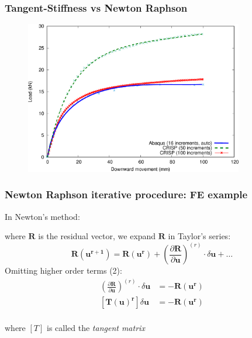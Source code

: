 \documentclass[notes]{beamer}
\begin{document}
\begin{frame}
\frametitle{Tangent-Stiffness vs Newton Raphson}
\begin{figure}[ht]
	\centering
	\includegraphics[width=0.85\textwidth]{figs/nr-tangent-stiffness.png}
\end{figure}
\end{frame}

\begin{frame}
\frametitle{Newton Raphson iterative procedure: FE example}
In Newton's method:

where ${\mathbf{R}}$ is the residual vector, we expand ${\mathbf{R}}$ in Taylor's series:
	\begin{equation*}
		{\mathbf{R({u^{r+1}})}} = {\mathbf{R({u^{r}})}} + \left(\frac{\partial \mathbf{R}}{\partial\mathbf{u}}\right)^{(r)}\cdot {\delta \mathbf{u}} + \dots
	\end{equation*}
	Omitting higher order terms (2):
	\begin{align*}
		\left(\frac{\partial \mathbf{R}}{\partial\mathbf{u}}\right)^{(r)}\cdot {\delta \mathbf{u}} & = -{\mathbf{R({u^{r}})}} \\
		\left[\mathbf{T({u})^r}\right]{\delta \mathbf{u}} & = -{\mathbf{R({u^{r}})}} \\
	\end{align*}

where $[T]$ is called the \textit{tangent matrix}

\end{frame}
\end{document}
